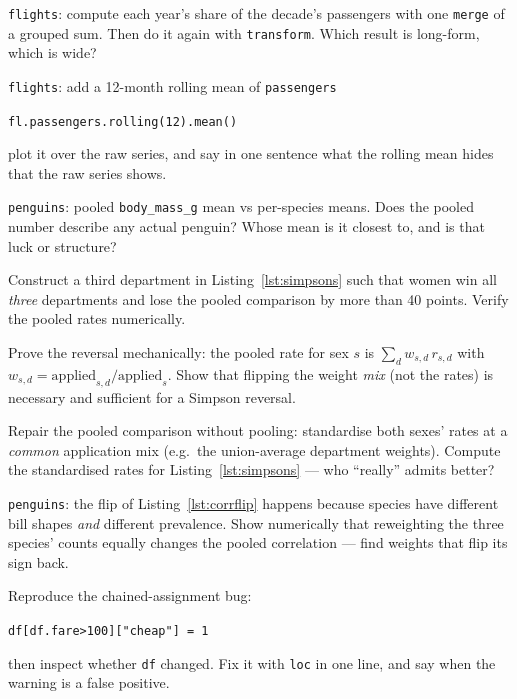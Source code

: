 \begin{exercise}[medium]
\texttt{flights}: compute each year's share of the decade's passengers with
one \texttt{merge} of a grouped sum. Then do it again with
\texttt{transform}. Which result is long-form, which is wide?
\end{exercise}
\begin{exercise}[medium]
\texttt{flights}: add a 12-month rolling mean of \texttt{passengers}
  \par\texttt{fl.passengers.rolling(12).mean()}
  \par\noindent plot it over the raw series, and say in one sentence what
  the rolling mean hides that the raw series shows.
\end{exercise}
\begin{exercise}[medium]
\texttt{penguins}: pooled \texttt{body\_mass\_g} mean vs per-species means.
Does the pooled number describe any actual penguin? Whose mean is it
closest to, and is that luck or structure?
\end{exercise}
\begin{exercise}[hard]
Construct a third department in Listing~\ref{lst:simpsons} such that women
win all \emph{three} departments and lose the pooled comparison by more
than 40 points. Verify the pooled rates numerically.
\end{exercise}
\begin{exercise}[hard]
Prove the reversal mechanically: the pooled rate for sex $s$ is
$\sum_d w_{s,d}\, r_{s,d}$ with $w_{s,d} = \mathrm{applied}_{s,d} /
\mathrm{applied}_s$. Show that flipping the weight \emph{mix} (not the
rates) is necessary and sufficient for a Simpson reversal.
\end{exercise}
\begin{exercise}[hard]
Repair the pooled comparison without pooling: standardise both sexes'
rates at a \emph{common} application mix (e.g.\ the union-average
department weights). Compute the standardised rates for
Listing~\ref{lst:simpsons} --- who ``really'' admits better?
\end{exercise}
\begin{exercise}[hard]
\texttt{penguins}: the flip of Listing~\ref{lst:corrflip} happens because
species have different bill shapes \emph{and} different prevalence. Show
numerically that reweighting the three species' counts equally changes the
pooled correlation --- find weights that flip its sign back.
\end{exercise}
\begin{exercise}[hard]
Reproduce the chained-assignment bug:
\par\texttt{df[df.fare>100]["cheap"] = 1}
\par\noindent then inspect whether \texttt{df} changed. Fix it with
\texttt{loc} in one line, and say when the warning is a false positive.
\end{exercise}

